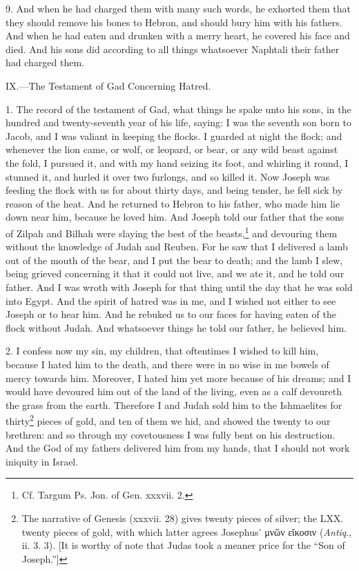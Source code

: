 9. And when he had charged them with many such words, he exhorted them that they should remove his bones to Hebron, and should bury him with his fathers. And when he had eaten and drunken with a merry heart, he covered his face and died. And his sons did according to all things whatsoever Naphtali their father had charged them.


IX.—The Testament of Gad Concerning Hatred.

1. The record of the testament of Gad, what things he spake unto his sons, in the hundred and twenty-seventh year of his life, saying: I was the seventh son born to Jacob, and I was valiant in keeping the flocks. I guarded at night the flock; and whenever the lion came, or wolf, or leopard, or bear, or any wild beast against the fold, I pursued it, and with my hand seizing its foot, and whirling it round, I stunned it, and hurled it over two furlongs, and so killed it. Now Joseph was feeding the flock with us for about thirty days, and being tender, he fell sick by reason of the heat. And he returned to Hebron to his father, who made him lie down near him, because he loved him. And Joseph told our father that the sons of Zilpah and Bilhah were slaying the best of the beasts,\footnote{Cf. Targum Ps. Jon. of Gen. xxxvii. 2.} and devouring them without the knowledge of Judah and Reuben. For he saw that I delivered a lamb out of the mouth of the bear, and I put the bear to death; and the lamb I slew, being grieved concerning it that it could not live, and we ate it, and he told our father. And I was wroth with Joseph for that thing until the day that he was sold into Egypt. And the spirit of hatred was in me, and I wished not either to see Joseph or to hear him. And he rebuked us to our faces for having eaten of the flock without Judah. And whatsoever things he told our father, he believed him.

2. I confess now my sin, my children, that oftentimes I wished to kill him, because I hated him to the death, and there were in no wise in me bowels of mercy towards him. Moreover, I hated him yet more because of his dreams; and I would have devoured him out of the land of the living, even as a calf devoureth the grass from the earth. Therefore I and Judah sold him to the Ishmaelites for thirty\footnote{The narrative of Genesis (xxxvii. 28) gives twenty pieces of silver; the LXX. twenty pieces of gold, with which latter agrees Josephus’ \textgreek{μνῶν εἴκοσιν} (\emph{Antiq}., ii. 3. 3). [It is worthy of note that Judas took a meaner price for the “Son of Joseph.”]} pieces of gold, and ten of them we hid, and showed the twenty to our brethren: and so through my covetousness I was fully bent on his destruction. And the God of my fathers delivered him from my hands, that I should not work iniquity in Israel.

